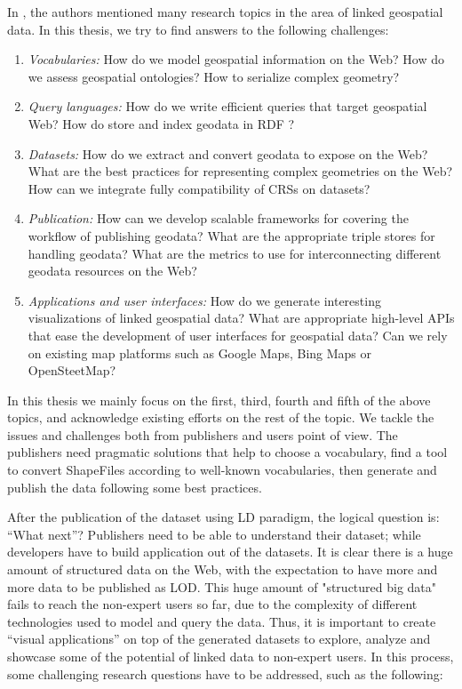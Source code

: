 In \cite{koubarakis12}, the authors mentioned many research topics in the area of linked geospatial data. In this thesis, we try to find answers to the following challenges:

\begin{enumerate}

\item \textit{Vocabularies:} How do we model geospatial information on the Web? How do we assess geospatial ontologies? How to serialize complex geometry? 
\item \textit{Query languages:} How do we write efficient queries that target geospatial Web? How do store and index geodata in RDF ?
\item \textit{Datasets:} How do we extract and convert geodata to expose on the Web? What are the best practices for representing complex geometries on the Web? How can we integrate fully compatibility of CRSs on datasets? 
\item \textit{Publication:} How can we develop scalable frameworks for covering the workflow of publishing geodata? What are the appropriate triple stores for handling geodata? What are the metrics to use for interconnecting different geodata resources on the Web?  
\item \textit{Applications and user interfaces:} How do we generate interesting visualizations of linked geospatial data? What are appropriate high-level APIs that ease the development of user interfaces for geospatial data? Can we rely on existing map platforms such as Google Maps, Bing Maps or OpenSteetMap?
\end{enumerate}

In this thesis we mainly focus on the first, third, fourth and fifth of the above topics, and acknowledge existing efforts on the rest of the topic. We tackle the issues and challenges both from publishers and users point of view. The publishers need pragmatic solutions that help to choose a vocabulary, find a tool to convert ShapeFiles according to well-known vocabularies, then generate and publish the data following some best practices.


After the publication of the dataset using LD paradigm, the logical question is: ``What next''? Publishers need to be able to understand their dataset; while developers have to build application out of the datasets. It is clear there is a huge amount of structured data on the Web, with the expectation to have more and more 
data to be published as LOD. This huge amount of "structured big data" fails to reach the non-expert users 
so far, due to the complexity of different technologies used to model and query the data. Thus, it is 
important to create ``visual applications'' on top of the generated datasets to explore, analyze and showcase 
some of the potential of linked data to non-expert users. In this process, some challenging research questions have to be addressed, such as the following:

